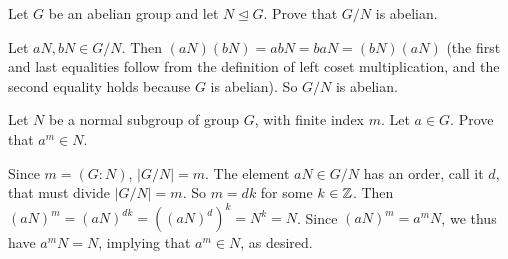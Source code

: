 \begin{exercise}
Let $G$ be an abelian group and let $N\unlhd G$. Prove that $G/N$ is abelian.
\end{exercise}

\begin{solution}[print=true]
Let $aN, bN\in G/N$.  Then $(aN)(bN)=abN=baN=(bN)(aN)$ (the first and last equalities follow from the definition of left coset multiplication, and the second equality holds because $G$ is abelian).  So $G/N$ is abelian.
\end{solution}

\begin{exercise} Let $N$ be a normal subgroup of group $G$, with finite index $m$.  Let $a\in G$. Prove that $a^m\in N$.
\end{exercise}

\begin{solution}[print=true]
Since $m=(G:N)$, $|G/N|=m$.  The element
$aN\in G/N$ has an order, call it $d$, that must divide $|G/N|=m$.
So $m=dk$ for some $k\in \mathbb{Z}$.  Then
$(aN)^m=(aN)^{dk}=((aN)^d)^k=N^k=N$. Since $(aN)^m=a^mN$, we thus
have $a^mN=N$, implying that $a^m\in N$, as desired.\end{solution}